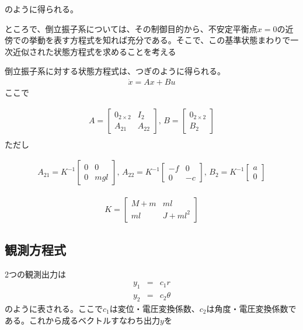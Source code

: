 \documentclass[a4j,11pt,twoside]{ujbook}
\begin{document}
のように得られる。

ところで、倒立振子系については、その制御目的から、不安定平衡点$x=0$の近傍での挙動を表す方程式を知れば充分である。そこで、この基準状態まわりで一次近似された状態方程式を求めることを考える

倒立振子系に対する状態方程式は、つぎのように得られる。
\begin{eqnarray}
\dot{x} = Ax + Bu
\label{eq:xdot}
\end{eqnarray}
\noindent
ここで

\begin{eqnarray*}
	A = \left[
	\begin{array}{cc}
		0_{2×2} & I_2\\
		A_{21} & A_{22}
	\end{array}
	\right],\,
	B = \left[
	\begin{array}{c}
		0_{2×2}\\
		B_2
	\end{array}
	\right]\\
\end{eqnarray*}
\noindent
ただし

\begin{eqnarray*}
	A_{21} = K^{-1}\left[
	\begin{array}{cc}
		0 &  0 \\
		0 & mgl
	\end{array}
	\right],\,
	A_{22} = K^{-1}\left[
	\begin{array}{cc}
		-f &  0 \\
		0 & -c
	\end{array}
	\right],\,
	B_{2} = K^{-1}\left[
	\begin{array}{c}
		a\\
		0
	\end{array}
	\right]
\end{eqnarray*}

\begin{eqnarray*}
	K = \left[
	\begin{array}{cc}
		M+m & ml \\
		ml & J+ml^2
	\end{array}
	\right]
\end{eqnarray*}

\subsection{観測方程式}
2つの観測出力は
\begin{eqnarray*}
	y_1 &=& c_1r\\
	y_2 &=& c_2\theta
\end{eqnarray*}
のように表される。ここで$c_1$は変位・電圧変換係数、$c_2$は角度・電圧変換係数である。これから成るベクトルすなわち出力$y$を
\end{document}
